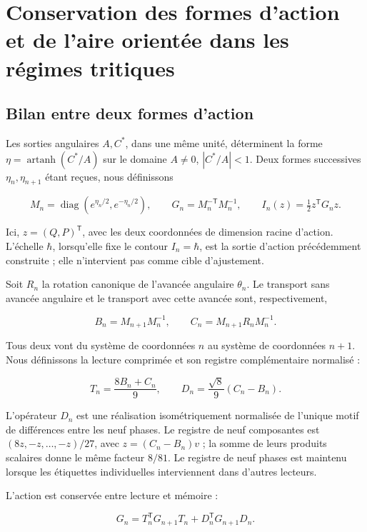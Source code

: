 \section{Conservation des formes d’action et de l’aire orientée dans les régimes tritiques
}
\label{nuclear:8}
\subsection{Bilan entre deux formes d’action
}

Les sorties angulaires \(A,C^*\), dans une même unité, déterminent la forme \(\eta=\operatorname{artanh}(C^*/A)\) sur le domaine \(A\ne0\), \(|C^*/A|<1\). Deux formes successives \(\eta_n,\eta_{n+1}\) étant reçues, nous définissons

\[
M_n=\operatorname{diag}(e^{\eta_n/2},e^{-\eta_n/2}),\qquad
G_n=M_n^{-\mathsf T}M_n^{-1},\qquad
I_n(z)=\tfrac12z^\mathsf TG_nz.
\]

Ici, \(z=(Q,P)^\mathsf T\), avec les deux coordonnées de dimension racine d’action. L’échelle \(\hbar\), lorsqu’elle fixe le contour \(I_n=\hbar\), est la sortie d’action précédemment construite ; elle n’intervient pas comme cible d’ajustement.


Soit \(R_n\) la rotation canonique de l’avancée angulaire \(\theta_n\). Le transport sans avancée angulaire et le transport avec cette avancée sont, respectivement,

\begin{equation}
B_n=M_{n+1}M_n^{-1},\qquad
C_n=M_{n+1}R_nM_n^{-1}.
\label{nuc08:eq:1}
\end{equation}

Tous deux vont du système de coordonnées \(n\) au système de coordonnées \(n+1\). Nous définissons la lecture comprimée et son registre complémentaire normalisé :

\begin{equation}
T_n=\frac{8B_n+C_n}{9},\qquad
D_n=\frac{\sqrt8}{9}(C_n-B_n).
\label{nuc08:eq:2}
\end{equation}

L’opérateur \(D_n\) est une réalisation isométriquement normalisée de l’unique motif de différences entre les neuf phases. Le registre de neuf composantes est \((8z,-z,\ldots,-z)/27\), avec \(z=(C_n-B_n)v\) ; la somme de leurs produits scalaires donne le même facteur \(8/81\). Le registre de neuf phases est maintenu lorsque les étiquettes individuelles interviennent dans d’autres lecteurs.


\begin{theorem}
L’action est conservée entre lecture et mémoire :

\begin{equation}
\boxed{G_n=T_n^\mathsf TG_{n+1}T_n+D_n^\mathsf TG_{n+1}D_n.}
\label{nuc08:eq:3}
\end{equation}
\end{theorem}

